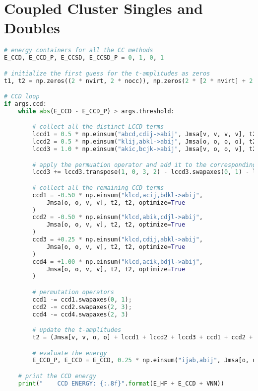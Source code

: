 \section{\texorpdfstring{Coupled Cluster Singles and Doubles\label{sec:cc_code_solution}}{Coupled Cluster Singles and Doubles}}

\raggedbottom\begin{lstlisting}[language=Python, caption={\acrshort{ccd} and \acrshort{ccsd} method exercise code solution.}, label=code:cc_solution]
# energy containers for all the CC methods
E_CCD, E_CCD_P, E_CCSD, E_CCSD_P = 0, 1, 0, 1

# initialize the first guess for the t-amplitudes as zeros
t1, t2 = np.zeros((2 * nvirt, 2 * nocc)), np.zeros(2 * [2 * nvirt] + 2 * [2 * nocc])

# CCD loop
if args.ccd:
    while abs(E_CCD - E_CCD_P) > args.threshold:

        # collect all the distinct LCCD terms
        lccd1 = 0.5 * np.einsum("abcd,cdij->abij", Jmsa[v, v, v, v], t2, optimize=True)
        lccd2 = 0.5 * np.einsum("klij,abkl->abij", Jmsa[o, o, o, o], t2, optimize=True)
        lccd3 = 1.0 * np.einsum("akic,bcjk->abij", Jmsa[v, o, o, v], t2, optimize=True)

        # apply the permuation operator and add it to the corresponding LCCD terms
        lccd3 += lccd3.transpose(1, 0, 3, 2) - lccd3.swapaxes(0, 1) - lccd3.swapaxes(2, 3)

        # collect all the remaining CCD terms
        ccd1 = -0.50 * np.einsum("klcd,acij,bdkl->abij",
            Jmsa[o, o, v, v], t2, t2, optimize=True
        )
        ccd2 = -0.50 * np.einsum("klcd,abik,cdjl->abij",
            Jmsa[o, o, v, v], t2, t2, optimize=True
        )
        ccd3 = +0.25 * np.einsum("klcd,cdij,abkl->abij",
            Jmsa[o, o, v, v], t2, t2, optimize=True
        )
        ccd4 = +1.00 * np.einsum("klcd,acik,bdjl->abij",
            Jmsa[o, o, v, v], t2, t2, optimize=True
        )

        # permutation operators
        ccd1 -= ccd1.swapaxes(0, 1);
        ccd2 -= ccd2.swapaxes(2, 3);
        ccd4 -= ccd4.swapaxes(2, 3)

        # update the t-amplitudes
        t2 = (Jmsa[v, v, o, o] + lccd1 + lccd2 + lccd3 + ccd1 + ccd2 + ccd3 + ccd4) / Emsd

        # evaluate the energy
        E_CCD_P, E_CCD = E_CCD, 0.25 * np.einsum("ijab,abij", Jmsa[o, o, v, v], t2)

    # print the CCD energy
    print("    CCD ENERGY: {:.8f}".format(E_HF + E_CCD + VNN))


\end{lstlisting}
